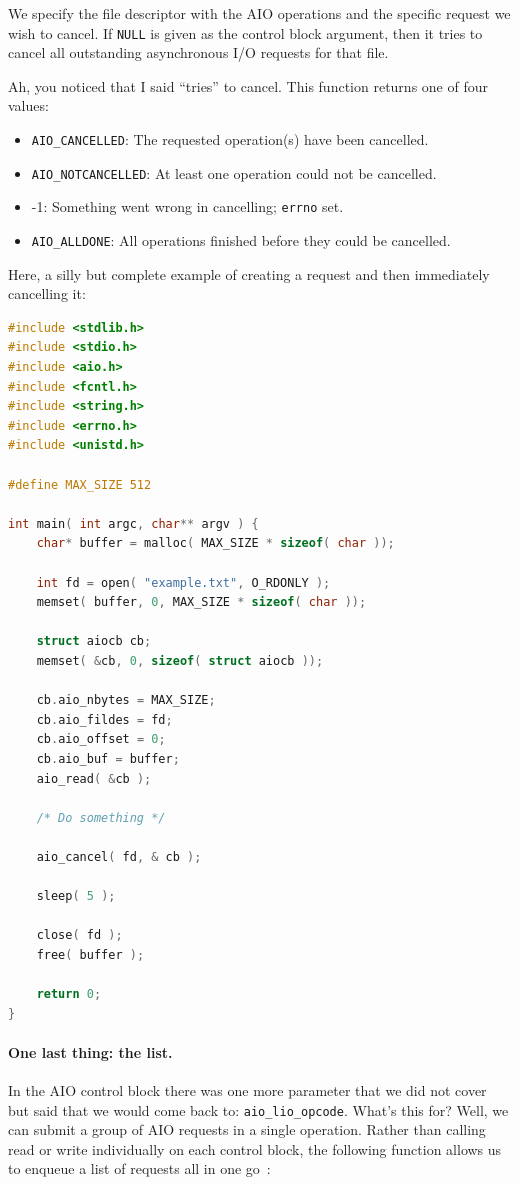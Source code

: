 \documentclass[a4paper]{report}
\begin{document}
We specify the file descriptor with the AIO operations and the specific request we wish to cancel. If \texttt{NULL} is given as the control block argument, then it tries to cancel all outstanding asynchronous I/O requests for that file.

Ah, you noticed that I said ``tries'' to cancel. This function returns one of four values:
\begin{itemize}
	\item \texttt{AIO\_CANCELLED}: The requested operation(s) have been cancelled.
	\item \texttt{AIO\_NOTCANCELLED}: At least one operation could not be cancelled.
	\item -1: Something went wrong in cancelling; \texttt{errno} set.
	\item \texttt{AIO\_ALLDONE}: All operations finished before they could be cancelled.
\end{itemize}

Here, a silly but complete example of creating a request and then immediately cancelling it:

\begin{lstlisting}[language=C]
#include <stdlib.h>
#include <stdio.h>
#include <aio.h>
#include <fcntl.h>
#include <string.h>
#include <errno.h>
#include <unistd.h>

#define MAX_SIZE 512

int main( int argc, char** argv ) {
    char* buffer = malloc( MAX_SIZE * sizeof( char ));

    int fd = open( "example.txt", O_RDONLY );
    memset( buffer, 0, MAX_SIZE * sizeof( char ));

    struct aiocb cb;
    memset( &cb, 0, sizeof( struct aiocb ));

    cb.aio_nbytes = MAX_SIZE;
    cb.aio_fildes = fd;
    cb.aio_offset = 0;
    cb.aio_buf = buffer;
    aio_read( &cb );
    
    /* Do something */
    
    aio_cancel( fd, & cb );

    sleep( 5 );

    close( fd );
    free( buffer );

    return 0;
}
\end{lstlisting}

\paragraph{One last thing: the list.}
In the AIO control block there was one more parameter that we did not cover but said that we would come back to: \texttt{aio\_lio\_opcode}. What's this for? Well, we can submit a group of AIO requests in a single operation. Rather than calling read or write individually on each control block, the following function allows us to enqueue a list of requests all in one go~\cite{apunix}:
\end{document}

